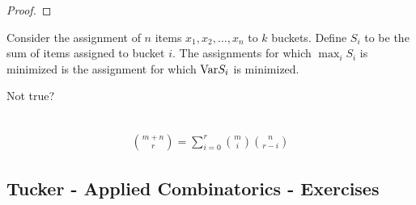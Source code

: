 \begin{proof}
\end{proof}

\begin{claim}
  Consider the assignment of $n$ items $x_1, x_2, \ldots, x_n$ to $k$ buckets. Define $S_i$ to be the sum of items assigned to bucket $i$. The assignments for which $\max_i S_i$ is minimized is the assignment for which $\text{Var} S_i$ is minimized.
\end{claim}

Not true?

\begin{theorem*}[Identities]~\\
  \begin{align*}
    {m + n \choose r} = \sum_{i=0}^r {m \choose i}{n \choose r - i}
  \end{align*}
\end{theorem*}

\subsection{Tucker - Applied Combinatorics - Exercises}

